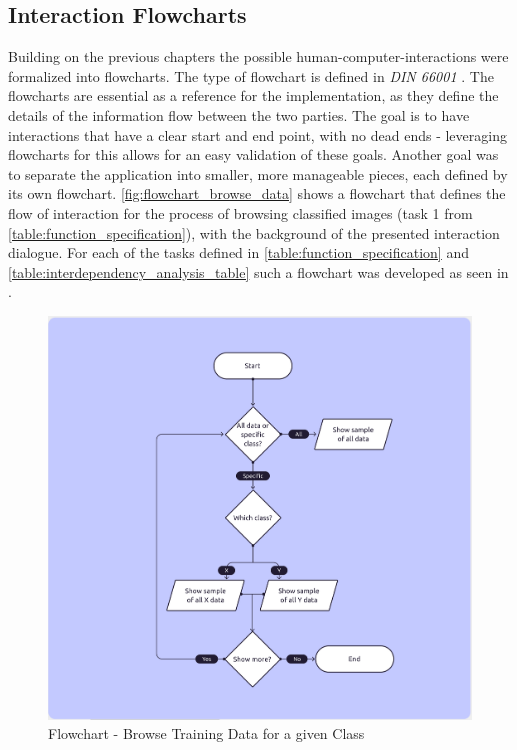 \documentclass[11pt,a4paper,english]{scrreprt}
\begin{document}
\subsection{Interaction Flowcharts}\label{subsection:interaction_flowcharts}
Building on the previous chapters the possible human-computer-interactions were formalized into flowcharts. The type of flowchart is defined in \textit{DIN 66001} \parencite{hering_programmablaufplan_1984}. The flowcharts are essential as a reference for the implementation, as they define the details of the information flow between the two parties. The goal is to have interactions that have a clear start and end point, with no dead ends - leveraging flowcharts for this allows for an easy validation of these goals. Another goal was to separate the application into smaller, more manageable pieces, each defined by its own flowchart. \autoref{fig:flowchart_browse_data} shows a flowchart that defines the flow of interaction for the process of browsing classified images (task 1 from \autoref{table:function_specification}), with the background of the presented interaction dialogue. For each of the tasks defined in \autoref{table:function_specification} and \autoref{table:interdependency_analysis_table} such a flowchart was developed as seen in .
\begin{figure}[htbp]
    \centering
    \includegraphics[width=\textwidth]{img/figures/flowcharts/browse_train_data_for_chosen_class.png}
    \caption{Flowchart - Browse Training Data for a given Class}
    \label{fig:flowchart_browse_data}
\end{figure}
\end{document}
